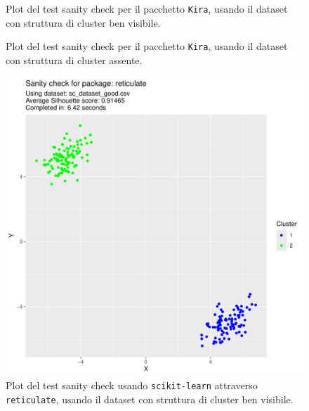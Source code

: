 \documentclass[italian]{article}
\begin{document}
			\begin{figure}[h]
				\caption{Plot del test sanity check per il pacchetto \texttt{Kira},
				usando il dataset con struttura di cluster ben visibile.}
				\label{fig:kiragood}
			\end{figure}

			\begin{figure}[h]
				\caption{Plot del test sanity check per il pacchetto \texttt{Kira},
				usando il dataset con struttura di cluster assente.}
				\label{fig:kirabad}
			\end{figure}

			\begin{figure}[h]
				\includegraphics[width = \textwidth, page = 1]{results/results_RETICULATE.pdf}
				\caption{Plot del test sanity check usando \texttt{scikit-learn} attraverso
				\texttt{reticulate}, usando il dataset con struttura di cluster ben visibile.}
				\label{fig:reticulategood}
			\end{figure}
\end{document}
